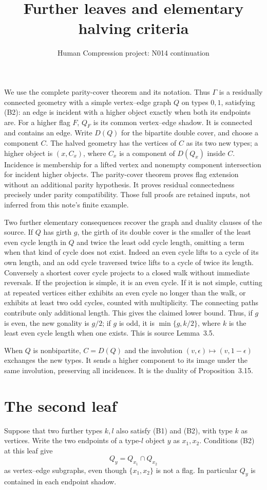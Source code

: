 \documentclass[11pt,a4paper]{article}
\title{Further leaves and elementary halving criteria}
\author{Human Compression project: N014 continuation}
\date{}
\begin{document}
\maketitle
We use the complete parity-cover theorem and its notation. Thus $\Gamma$
is a residually connected geometry with a simple vertex--edge graph $Q$
on types $0,1$, satisfying (B2): an edge is incident with a higher object
exactly when both its endpoints are. For a higher flag $F$, $Q_F$ is
its common vertex--edge shadow. It is connected and contains an edge.
Write $D(Q)$ for the bipartite double cover, and choose a component $C$.
The halved geometry has the vertices of $C$ as its two new types;
a higher object is $(x,C_x)$, where $C_x$ is a component of $D(Q_x)$
inside $C$. Incidence is membership for a lifted vertex and nonempty
component intersection for incident higher objects. The parity-cover
theorem proves flag extension without an additional parity hypothesis.
It proves residual connectedness precisely under parity compatibility.
Those full proofs are retained inputs, not inferred from this note's
finite example.

Two further elementary consequences recover the graph and duality
clauses of the source. If $Q$ has girth $g$, the girth of its double
cover is the smaller of the least even cycle length in $Q$ and twice
the least odd cycle length, omitting a term when that kind of cycle
does not exist. Indeed an even cycle lifts to a cycle of its own
length, and an odd cycle traversed twice lifts to a cycle of twice
its length. Conversely a shortest cover cycle projects to a closed
walk without immediate reversals. If the projection is simple, it
is an even cycle. If it is not simple, cutting at repeated vertices
either exhibits an even cycle no longer than the walk, or exhibits
at least two odd cycles, counted with multiplicity. The connecting
paths contribute only additional length. This gives the claimed
lower bound. Thus, if $g$ is even, the new gonality is $g/2$; if
$g$ is odd, it is $\min\{g,k/2\}$, where $k$ is the least even
cycle length when one exists. This is source Lemma~3.5.

When $Q$ is nonbipartite, $C=D(Q)$ and the involution
$(v,\epsilon)\mapsto(v,1-\epsilon)$ exchanges the new types.
It sends a higher component to its image under the same involution,
preserving all incidences. It is the duality of Proposition~3.15.

\section{The second leaf}
Suppose that two further types $k,l$ also satisfy (B1) and (B2), with
type $k$ as vertices. Write the two endpoints of a type-$l$ object $y$
as $x_1,x_2$. Conditions (B2) at this leaf give
\[
                 Q_y=Q_{x_1}\cap Q_{x_2}
\]
as vertex--edge subgraphs, even though $\{x_1,x_2\}$ is not a flag.
In particular $Q_y$ is contained in each endpoint shadow.
\end{document}
